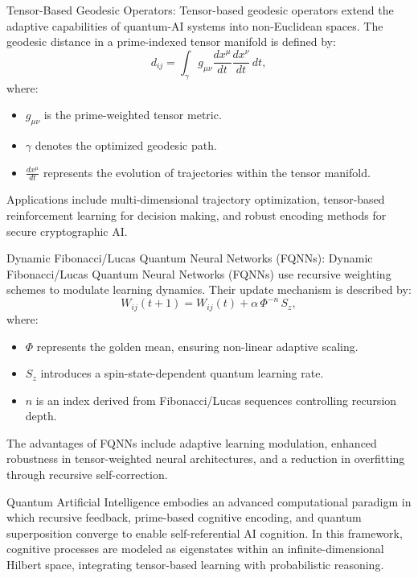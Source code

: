 \pa Tensor-Based Geodesic Operators: Tensor-based geodesic operators extend the adaptive capabilities of quantum-AI systems into non-Euclidean spaces. The geodesic distance in a prime-indexed tensor manifold is defined by:
\begin{equation}
d_{ij} = \int_{\gamma} g_{\mu\nu} \frac{dx^\mu}{dt}\frac{dx^\nu}{dt}\, dt,
\end{equation}
where:
\begin{itemize}
    \item \(g_{\mu\nu}\) is the prime-weighted tensor metric.
    \item \(\gamma\) denotes the optimized geodesic path.
    \item \(\frac{dx^\mu}{dt}\) represents the evolution of trajectories within the tensor manifold.
\end{itemize}
Applications include multi-dimensional trajectory optimization, tensor-based reinforcement learning for decision making, and robust encoding methods for secure cryptographic AI.

\pa Dynamic Fibonacci/Lucas Quantum Neural Networks (FQNNs): Dynamic Fibonacci/Lucas Quantum Neural Networks (FQNNs) use recursive weighting schemes to modulate learning dynamics. Their update mechanism is described by:
\begin{equation}
W_{ij}(t+1) = W_{ij}(t) + \alpha\, \Phi^{-n}\, S_z,
\end{equation}
where:
\begin{itemize}
    \item \(\Phi\) represents the golden mean, ensuring non-linear adaptive scaling.
    \item \(S_z\) introduces a spin-state-dependent quantum learning rate.
    \item \(n\) is an index derived from Fibonacci/Lucas sequences controlling recursion depth.
\end{itemize}
The advantages of FQNNs include adaptive learning modulation, enhanced robustness in tensor-weighted neural architectures, and a reduction in overfitting through recursive self-correction.


\pa Quantum Artificial Intelligence embodies an advanced computational paradigm in which recursive feedback, prime-based cognitive encoding, and quantum superposition converge to enable self-referential AI cognition. In this framework, cognitive processes are modeled as eigenstates within an infinite-dimensional Hilbert space, integrating tensor-based learning with probabilistic reasoning.

